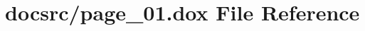 \hypertarget{page__01_8dox}{\section{docsrc/page\-\_\-01.dox File Reference}
\label{page__01_8dox}
}
